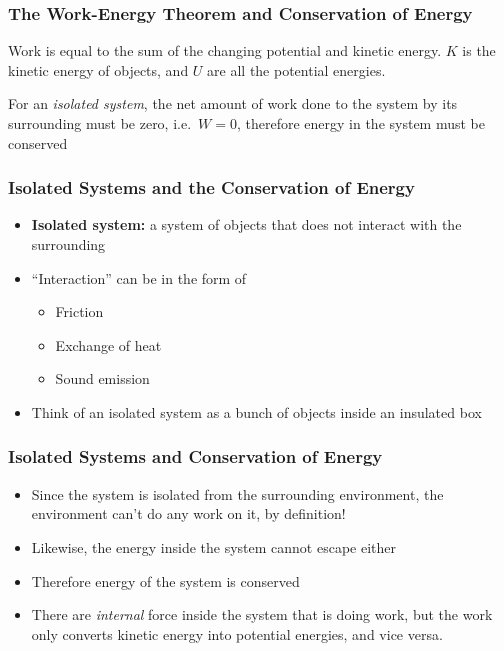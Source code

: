 \documentclass[12pt,compress,aspectratio=169]{beamer}
\newcommand{\eq}[2]{\vspace{#1}{\Large\begin{displaymath}#2\end{displaymath}}}
\begin{document}
\begin{frame}
  \frametitle{The Work-Energy Theorem and Conservation of Energy}
  Work is equal to the sum of the changing potential and kinetic energy.
  $K$ is the kinetic energy of objects, and $U$ are all the potential energies.

  \eq{-.2in}{\boxed{W = \Delta U+\Delta K}}

  For an \emph{isolated system}, the net amount of work done to the system
  by its surrounding must be zero, i.e.\ $W=0$, therefore energy in the system
  must be conserved
  
  \eq{-.2in}{\boxed{U + K = U' + K'}}
\end{frame}






\begin{frame}
  \frametitle{Isolated Systems and the Conservation of Energy}
  \begin{itemize}
  \item\textbf{Isolated system:} a system of objects that does not interact with
    the surrounding
  \item ``Interaction'' can be in the form of
    \begin{itemize}
    \item Friction
    \item Exchange of heat
    \item Sound emission
    \end{itemize}
  \item Think of an isolated system as a bunch of objects inside an insulated
    box
  \end{itemize}
  \begin{center}
  \end{center}
\end{frame}


\begin{frame}
  \frametitle{Isolated Systems and Conservation of Energy}
  \begin{itemize}
  \item Since the system is isolated from the surrounding environment, the
    environment can't do any work on it, by definition!
  \item Likewise, the energy inside the system cannot escape either
  \item Therefore energy of the system is conserved
  \item There are \emph{internal} force inside the system that is doing work,
    but the work only converts kinetic energy into potential energies, and vice
    versa.
  \end{itemize}
\end{frame}
\end{document}

